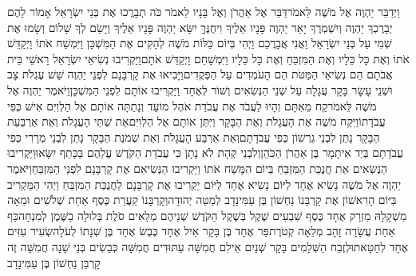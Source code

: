 \documentclass[../main/main.tex]{subfiles}
\begin{document}
\begin{multicols}{\ncols}
וַיְדַבֵּר יַהְוֶה אֶל מֹשֶׁה לֵּאמֹר\PreVerseSpace{}דַּבֵּר אֶל אַהֲרֹן וְאֶל בָּנָיו לֵאמֹר כֹּה תְבָרֲכוּ אֶת בְּנֵי יִשְׂרָאֵל אָמוֹר לָהֶם \ClosedSection{}יְבָרֶכְךָ יַהְוֶה וְיִשְׁמְרֶךָ \ClosedSection{}יָאֵר יַהְוֶה פָּנָיו אֵלֶיךָ וִיחֻנֶּךָּ \ClosedSection{}יִשָּׂא יַהְוֶה פָּנָיו אֵלֶיךָ וְיָשֵׂם לְךָ שָׁלוֹם \ClosedSection{}וְשָׂמוּ אֶת שְׁמִי עַל בְּנֵי יִשְׂרָאֵל וַאֲנִי אֲבָרֲכֵם \ClosedSection{}וַיְהִי בְּיוֹם כַּלּוֹת מֹשֶׁה לְהָקִים אֶת הַמִּשְׁכָּן וַיִּמְשַׁח אֹתוֹ וַיְקַדֵּשׁ אֹתוֹ וְאֶת כָּל כֵּלָיו וְאֶת הַמִּזְבֵּחַ וְאֶת כָּל כֵּלָיו וַיִּמְשָׁחֵם וַיְקַדֵּשׁ אֹתָם\PreVerseSpace{}וַיַּקְרִיבוּ נְשִׂיאֵי יִשְׂרָאֵל רָאשֵׁי בֵּית אֲבֹתָם הֵם נְשִׂיאֵי הַמַּטֹּת הֵם הָעֹמְדִים עַל הַפְּקֻדִים\PreVerseSpace{}וַיָּבִיאוּ אֶת קָרְבָּנָם לִפְנֵי יַהְוֶה שֵׁשׁ עֶגְלֹת צָב וּשְׁנֵי עָשָׂר בָּקָר עֲגָלָה עַל שְׁנֵי הַנְּשִׂאִים וְשׁוֹר לְאֶחָד וַיַּקְרִיבוּ אוֹתָם לִפְנֵי הַמִּשְׁכָּן\PreVerseSpace{}וַיֹּאמֶר יַהְוֶה אֶל מֹשֶׁה לֵּאמֹר\PreVerseSpace{}קַח מֵאִתָּם וְהָיוּ לַעֲבֹד אֶת עֲבֹדַת אֹהֶל מוֹעֵד וְנָתַתָּה אוֹתָם אֶל הַלְוִיִּם אִישׁ כְּפִי עֲבֹדָתוֹ\PreVerseSpace{}וַיִּקַּח מֹשֶׁה אֶת הָעֲגָלֹת וְאֶת הַבָּקָר וַיִּתֵּן אוֹתָם אֶל הַלְוִיִּם\PreVerseSpace{}אֵת שְׁתֵּי הָעֲגָלֹת וְאֵת אַרְבַּעַת הַבָּקָר נָתַן לִבְנֵי גֵרְשׁוֹן כְּפִי עֲבֹדָתָם\PreVerseSpace{}וְאֵת אַרְבַּע הָעֲגָלֹת וְאֵת שְׁמֹנַת הַבָּקָר נָתַן לִבְנֵי מְרָרִי כְּפִי עֲבֹדָתָם בְּיַד אִיתָמָר בֶּן אַהֲרֹן הַכֹּהֵן\PreVerseSpace{}וְלִבְנֵי קְהָת לֹא נָתָן כִּי עֲבֹדַת הַקֹּדֶשׁ עֲלֵהֶם בַּכָּתֵף יִשָּׂאוּ\PreVerseSpace{}וַיַּקְרִיבוּ הַנְּשִׂאִים אֵת חֲנֻכַּת הַמִּזְבֵּחַ בְּיוֹם הִמָּשַׁח אֹתוֹ וַיַּקְרִיבוּ הַנְּשִׂיאִם אֶת קָרְבָּנָם לִפְנֵי הַמִּזְבֵּחַ\PreVerseSpace{}וַיֹּאמֶר יַהְוֶה אֶל מֹשֶׁה נָשִׂיא אֶחָד לַיּוֹם נָשִׂיא אֶחָד לַיּוֹם יַקְרִיבוּ אֶת קָרְבָּנָם לַחֲנֻכַּת הַמִּזְבֵּחַ \ClosedSection{}וַיְהִי הַמַּקְרִיב בַּיּוֹם הָרִאשׁוֹן אֶת קָרְבָּנוֹ נַחְשׁוֹן בֶּן עַמִּינָדָב לְמַטֵּה יְהוּדָה\PreVerseSpace{}וְקָרְבָּנוֹ קַעֲרַת כֶּסֶף אַחַת שְׁלֹשִׁים וּמֵאָה מִשְׁקָלָהּ מִזְרָק אֶחָד כֶּסֶף שִׁבְעִים שֶׁקֶל בְּשֶׁקֶל הַקֹּדֶשׁ שְׁנֵיהֶם מְלֵאִים סֹלֶת בְּלוּלָה בַשֶּׁמֶן לְמִנְחָה\PreVerseSpace{}כַּף אַחַת עֲשָׂרָה זָהָב מְלֵאָה קְטֹרֶת\PreVerseSpace{}פַּר אֶחָד בֶּן בָּקָר אַיִל אֶחָד כֶּבֶשׂ אֶחָד בֶּן שְׁנָתוֹ לְעֹלָה\PreVerseSpace{}שְׂעִיר עִזִּים אֶחָד לְחַטָּאת\PreVerseSpace{}וּלְזֶבַח הַשְּׁלָמִים בָּקָר שְׁנַיִם אֵילִם חֲמִשָּׁה עַתּוּדִים חֲמִשָּׁה כְּבָשִׂים בְּנֵי שָׁנָה חֲמִשָּׁה זֶה קָרְבַּן נַחְשׁוֹן בֶּן עַמִּינָדָב\OpenSection{}\par

\end{multicols}
\end{document}
